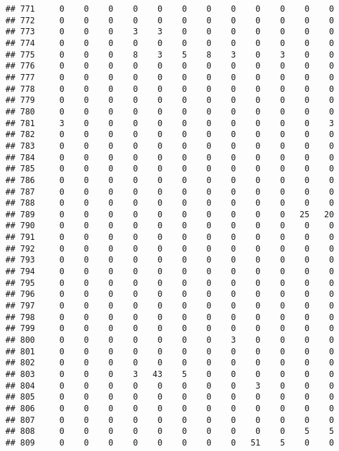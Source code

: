 \documentclass[]{article}
\begin{document}
\begin{verbatim}
## 771     0    0    0    0    0    0    0    0    0    0    0    0
## 772     0    0    0    0    0    0    0    0    0    0    0    0
## 773     0    0    0    3    3    0    0    0    0    0    0    0
## 774     0    0    0    0    0    0    0    0    0    0    0    0
## 775     0    0    0    8    3    5    8    3    0    3    0    0
## 776     0    0    0    0    0    0    0    0    0    0    0    0
## 777     0    0    0    0    0    0    0    0    0    0    0    0
## 778     0    0    0    0    0    0    0    0    0    0    0    0
## 779     0    0    0    0    0    0    0    0    0    0    0    0
## 780     0    0    0    0    0    0    0    0    0    0    0    0
## 781     3    0    0    0    0    0    0    0    0    0    0    3
## 782     0    0    0    0    0    0    0    0    0    0    0    0
## 783     0    0    0    0    0    0    0    0    0    0    0    0
## 784     0    0    0    0    0    0    0    0    0    0    0    0
## 785     0    0    0    0    0    0    0    0    0    0    0    0
## 786     0    0    0    0    0    0    0    0    0    0    0    0
## 787     0    0    0    0    0    0    0    0    0    0    0    0
## 788     0    0    0    0    0    0    0    0    0    0    0    0
## 789     0    0    0    0    0    0    0    0    0    0   25   20
## 790     0    0    0    0    0    0    0    0    0    0    0    0
## 791     0    0    0    0    0    0    0    0    0    0    0    0
## 792     0    0    0    0    0    0    0    0    0    0    0    0
## 793     0    0    0    0    0    0    0    0    0    0    0    0
## 794     0    0    0    0    0    0    0    0    0    0    0    0
## 795     0    0    0    0    0    0    0    0    0    0    0    0
## 796     0    0    0    0    0    0    0    0    0    0    0    0
## 797     0    0    0    0    0    0    0    0    0    0    0    0
## 798     0    0    0    0    0    0    0    0    0    0    0    0
## 799     0    0    0    0    0    0    0    0    0    0    0    0
## 800     0    0    0    0    0    0    0    3    0    0    0    0
## 801     0    0    0    0    0    0    0    0    0    0    0    0
## 802     0    0    0    0    0    0    0    0    0    0    0    0
## 803     0    0    0    3   43    5    0    0    0    0    0    0
## 804     0    0    0    0    0    0    0    0    3    0    0    0
## 805     0    0    0    0    0    0    0    0    0    0    0    0
## 806     0    0    0    0    0    0    0    0    0    0    0    0
## 807     0    0    0    0    0    0    0    0    0    0    0    0
## 808     0    0    0    0    0    0    0    0    0    0    5    5
## 809     0    0    0    0    0    0    0    0   51    5    0    0

\end{verbatim}
\end{document}
